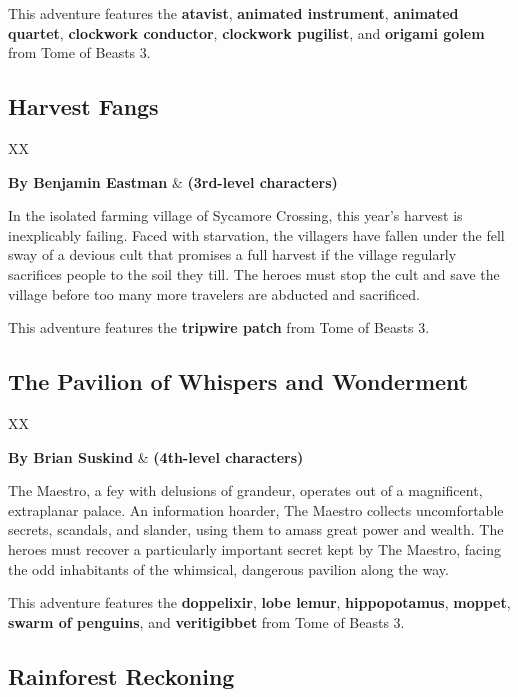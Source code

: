 \documentclass[10pt,a4paper,twoside,bg=print,twocolumn,openany,nodeprecatedcode]{dndbook}
\begin{document}
This adventure features the \textbf{atavist}, \textbf{animated instrument}, \textbf{animated quartet}, \textbf{clockwork conductor}, \textbf{clockwork pugilist}, and \textbf{origami golem} from Tome of Beasts 3.

\subsection{Harvest Fangs}

\begin{DndTable}{XX}

\textbf{By Benjamin Eastman} & \textbf{(3rd-level characters)}\\
\end{DndTable}

In the isolated farming village of Sycamore Crossing, this year's harvest is inexplicably failing. Faced with starvation, the villagers have fallen under the fell sway of a devious cult that promises a full harvest if the village regularly sacrifices people to the soil they till. The heroes must stop the cult and save the village before too many more travelers are abducted and sacrificed.

This adventure features the \textbf{tripwire patch} from Tome of Beasts 3.

\subsection{The Pavilion of Whispers and Wonderment}

\begin{DndTable}{XX}

\textbf{By Brian Suskind} & \textbf{(4th-level characters)}\\
\end{DndTable}

The Maestro, a fey with delusions of grandeur, operates out of a magnificent, extraplanar palace. An information hoarder, The Maestro collects uncomfortable secrets, scandals, and slander, using them to amass great power and wealth. The heroes must recover a particularly important secret kept by The Maestro, facing the odd inhabitants of the whimsical, dangerous pavilion along the way.

This adventure features the \textbf{doppelixir}, \textbf{lobe lemur}, \textbf{hippopotamus}, \textbf{moppet}, \textbf{swarm of penguins}, and \textbf{veritigibbet} from Tome of Beasts 3.

\subsection{Rainforest Reckoning}
\end{document}
